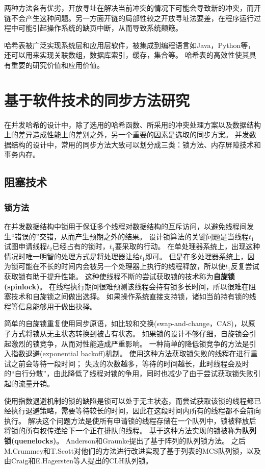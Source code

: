 两种方法各有优劣，开放寻址在解决当前冲突的情况下可能会导致新的冲突，而开链不会产生这种问题。另一方面开链的局部性较之开放寻址法要差，在程序运行过程中可能引起操作系统的缺页中断，从而导致系统颠簸。

哈希表被广泛实现系统层和应用层软件，被集成到编程语言如Java，Python等，还可以用来实现关联数组，数据库索引，缓存，集合等。
哈希表的高效性使其具有重要的研究价值和应用价值。

\section{基于软件技术的同步方法研究}

在并发哈希的设计中，除了选用的哈希函数、所采用的冲突处理方案以及数据结构上的差异造成性能上的差别之外，另一个重要的因素是选取的同步方案。
并发数据结构的设计中，常用的同步方法大致可以划分成三类：锁方法、内存屏障技术和事务内存。

\subsection{阻塞技术}
\subsubsection{锁方法}
在并发数据结构中锁用于保证多个线程对数据结构的互斥访问，以避免线程间发生“错误的”交错，从而产生预期之外的结果。
设计锁算法的关键问题是当线程$t_1$试图申请线程$t_2$已经占有的锁时，$t_1$要采取的行动。
在单处理器系统上，出现这种情况时唯一明智的处理方式是将处理器让给$t_1$即可。
但是在多处理器系统上，因为锁可能在不长的时间内会被另一个处理器上执行的线程释放，所以使$t_1$反复尝试获取锁有助于提升性能。
这种使线程不断的尝试获取锁的技术称为\textbf{自旋锁(spinlock)}。
在线程执行期间很难预测该线程会持有锁多长时间，所以很难在阻塞技术和自旋锁之间做出选择。
如果操作系统直接支持锁，诸如当前持有锁的线程等信息能够用于做出抉择。

简单的自旋锁重复使用同步原语，如比较和交换(swap-and-change，CAS)，以原子方式将锁从无主状态转换到被占有状态。 如果锁的设计不够仔细，自旋锁会引起激烈的锁竞争，从而对性能造成严重影响。
一种简单的降低锁竞争的方法是引入指数退避(exponential backoff)机制\cite{agarwal1989adaptive}。
使用这种方法获取锁失败的线程在进行重试之前会等待一段时间；
失败的次数越多，等待的时间越长，此时线程会及时的“自行分散”，由此降低了线程对锁的争用，同时也减少了由于尝试获取锁失败引起的流量开销。

使用指数退避机制的锁的缺陷是锁可以处于无主状态，而尝试获取该锁的线程都已经执行退避策略，需要等待较长的时间，因此在这段时间内所有的线程都不会前向执行。
解决这个问题方法是使所有申请锁的线程存储在一个队列中，锁被释放后将锁的所有权传递给下一个正在排队的线程。
基于这种方法实现的锁被称为\textbf{队列锁(quenelocks)}。
Anderson\cite{anderson1989performance}和Graunke\cite{graunke1990synchronization}提出了基于阵列的队列锁方法。
之后M.Crummey和T.Scott\cite{mellor1991algorithms}对他们的方法进行改进实现了基于列表的MCS队列锁，以及由Craig和E.Hagersten等人\cite{craig1993building,magnusson1994queue}提出的CLH队列锁。

